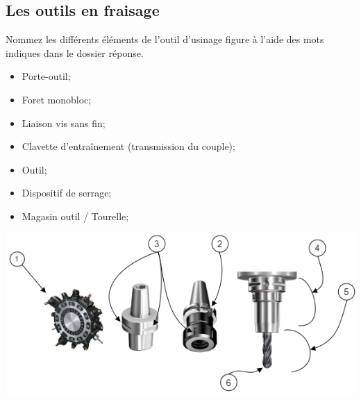 \documentclass[12pt,a4paper]{article} %
\begin{document}
\newpage

\subsection{Les outils en fraisage}

\begin{exo} Nommez les différents éléments de l’outil d’usinage figure à l'aide des mots
indiques dans le dossier réponse. \end{exo}


\begin{minipage}{.55\linewidth}
\begin{itemize}
    \item  {} Porte-outil;
    \item  {} Foret monobloc;
    \item  {} Liaison vis sans fin;
    \item  {} Clavette d'entraînement (transmission du couple);
\end{itemize} 
\end{minipage}
\begin{minipage}{.44\linewidth}
\begin{itemize}
    \item  {} Outil;
    \item  {} Dispositif de serrage;
    \item  {} Magasin outil / Tourelle;
\end{itemize} 
\end{minipage}


\includegraphics[scale=0.95]{FF1.png}
\end{document}
